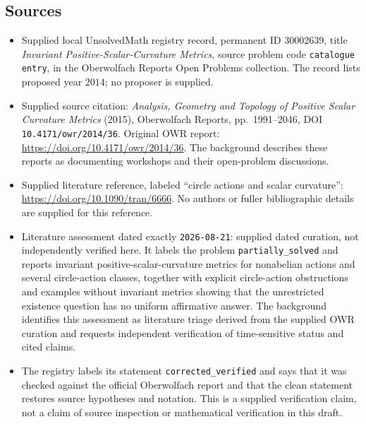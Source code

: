 \documentclass[11pt]{article}
\begin{document}
\subsection{Sources}
\begin{itemize}
\item Supplied local UnsolvedMath registry record, permanent ID \(30002639\), title \emph{Invariant Positive-Scalar-Curvature Metrics}, source problem code \texttt{catalogue entry}, in the Oberwolfach Reports Open Problems collection. The record lists proposed year \(2014\); no proposer is supplied.
\item Supplied source citation: \emph{Analysis, Geometry and Topology of Positive Scalar Curvature Metrics} (2015), Oberwolfach Reports, pp.\ 1991--2046, DOI \texttt{10.4171/owr/2014/36}. Original OWR report: \url{https://doi.org/10.4171/owr/2014/36}. The background describes these reports as documenting workshops and their open-problem discussions.
\item Supplied literature reference, labeled ``circle actions and scalar curvature'': \url{https://doi.org/10.1090/tran/6666}. No authors or fuller bibliographic details are supplied for this reference.
\item Literature assessment dated exactly \texttt{2026-08-21}: supplied dated curation, not independently verified here. It labels the problem \texttt{partially\_solved} and reports invariant positive-scalar-curvature metrics for nonabelian actions and several circle-action classes, together with explicit circle-action obstructions and examples without invariant metrics showing that the unrestricted existence question has no uniform affirmative answer. The background identifies this assessment as literature triage derived from the supplied OWR curation and requests independent verification of time-sensitive status and cited claims.
\item The registry labels its statement \texttt{corrected\_verified} and says that it was checked against the official Oberwolfach report and that the clean statement restores source hypotheses and notation. This is a supplied verification claim, not a claim of source inspection or mathematical verification in this draft.
\end{itemize}
\end{document}
